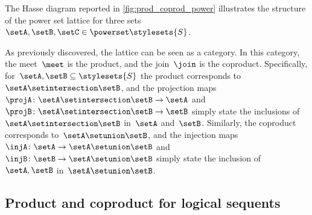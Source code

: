 The Hasse diagram reported in \cref{fig:prod_coprod_power} illustrates the structure of the power set lattice for three sets~$\setA,\setB,\setC\in \powerset \stylesets{S}$.

As previously discovered, the lattice can be seen as a category.
In this category, the meet~$\meet$ is the product, and the join~$\join$ is the coproduct.
Specifically, for~$\setA,\setB\subseteq\stylesets{S}$ the product corresponds to~$\setA\setintersection \setB$, and the projection maps~$\projA\colon \setA\setintersection \setB\to \setA$ and~$\projB\colon \setA\setintersection \setB\to \setB$ simply state the inclusions of~$\setA\setintersection \setB$ in~$\setA$ and~$\setB$.
Similarly, the coproduct corresponds to~$\setA\setunion \setB$, and the injection maps~$\injA\colon \setA\to \setA\setunion \setB$ and~$\injB\colon \setB\to \setA\setunion \setB$ simply state the inclusion of~$\setA,\setB$ in~$\setA\setunion \setB$.

\subsection{Product and coproduct for logical sequents}

